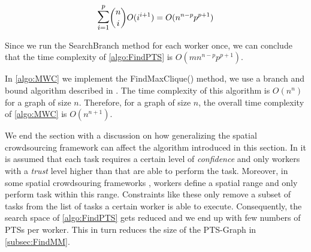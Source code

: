 \begin{equation*}
\mathlarger{\mathlarger{\sum}}_{i = 1}^{p} \dbinom{n}{i} O(i^{i+1}) = O(n^{n-p}p^{p+1})
\end{equation*}

Since we run the SearchBranch method for each worker once, we can conclude that the time complexity of \cref{algo:FindPTS} is $O(mn^{n-p}p^{p+1})$.

In \cref{algo:MWC} we implement the FindMaxClique() method, we use a branch and bound algorithm described in \cite{Ostergard01}. The time complexity of this algorithm is $O(n^n)$ for a graph of size $n$. Therefore, for a graph of size $n$, the overall time complexity of \cref{algo:MWC} is $O(n^{n+1})$.

We end the section with a discussion on how generalizing the spatial crowdsourcing framework can affect the algorithm introduced in this section. In \cite{Kazemi13} it is assumed that each task requires a certain level of \emph{confidence} and only workers with a \emph{trust} level higher than that are able to perform the task. Moreover, in some spatial crowdsouring frameworks \cite{Kazemi12,Kazemi13,Deng13}, workers define a spatial range and only perform task within this range. Constraints like these only remove a subset of tasks from the list of tasks a certain worker is able to execute. Consequently, the search space of \cref{algo:FindPTS} gets reduced and we end up with few numbers of PTSs per worker. This in turn reduces the size of the PTS-Graph in \cref{subsec:FindMM}.